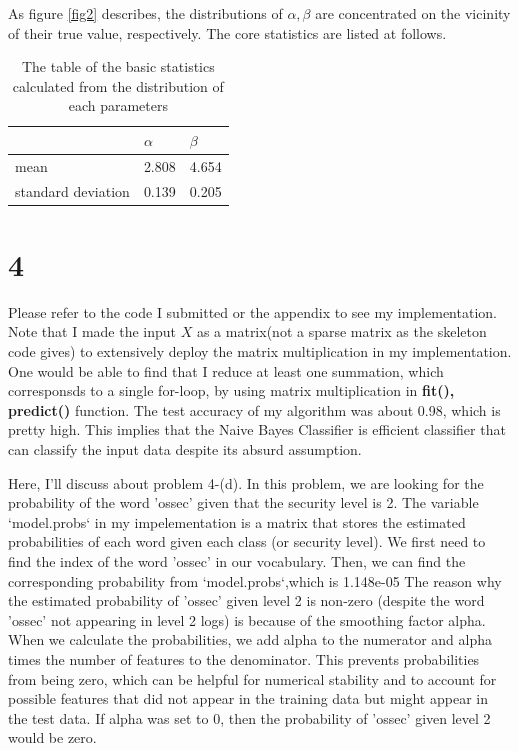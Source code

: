 \documentclass[10pt]{article}
\begin{document}
As figure \ref{fig2} describes, the distributions of $\alpha,\beta$ are concentrated on the vicinity of their true value, respectively. 
The core statistics are listed at follows.
\begin{table}[!h]
    \begin{center}
        \begin{tabular}{lll}
            & $\alpha$ & $\beta$ \\
            \hline \hline
        mean               & 2.808                 & 4.654                \\
        standard deviation & 0.139                 & 0.205               
        \end{tabular}
        \caption{The table of the basic statistics calculated from the distribution of each parameters}
    \end{center}
\end{table}

\section*{4}
Please refer to the code I submitted or the appendix to see my implementation.
Note that I made the input $X$ as a matrix(not a sparse matrix as the skeleton code gives) to extensively deploy the matrix multiplication in my implementation.
One would be able to find that I reduce at least one summation, which corresponsds to a single for-loop, by using matrix multiplication in \textbf{fit(), predict()} function.
The test accuracy of my algorithm was about 0.98, which is pretty high. This implies that the Naive Bayes Classifier is efficient classifier that can classify the input data despite its absurd assumption.

Here, I'll discuss about problem 4-(d).
In this problem, we are looking for the probability of the word 'ossec' given that the security level is 2. The variable `model.probs` in my impelementation is a matrix that stores the estimated probabilities of each word given each class (or security level). 
We first need to find the index of the word 'ossec' in our vocabulary. Then, we can find the corresponding probability from `model.probs`,which is 1.148e-05
The reason why the estimated probability of 'ossec' given level 2 is non-zero (despite the word 'ossec' not appearing in level 2 logs) is because of the smoothing factor alpha. 
When we calculate the probabilities, we add alpha to the numerator and alpha times the number of features to the denominator. 
This prevents probabilities from being zero, which can be helpful for numerical stability and to account for possible features that did not appear in the training data but might appear in the test data. 
If alpha was set to 0, then the probability of 'ossec' given level 2 would be zero. 
\end{document}
